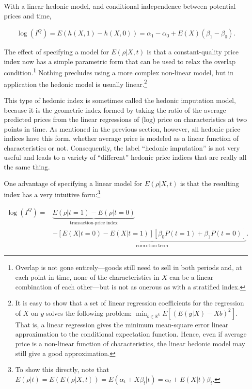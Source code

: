 \documentclass[]{article}
\begin{document}
With a linear hedonic model, and conditional independence between potential prices and time,

\begin{align*}
\log(I^{Q}) = E(h(X, 1) - h(X, 0)) = \alpha_{1} - \alpha_{0} + E(X)(\beta_{1} - \beta_{0}). 
\end{align*}

The effect of specifying a model for \(E(\rho | X, t)\) is that a constant-quality price index now has a simple parametric form that can be used to relax the overlap condition.\footnote{Overlap is not gone entirely---goods still need to sell in both periods and, at each point in time, none of the characteristics in \(X\) can be a linear combination of each other---but is not as onerous as with a stratified index.} Nothing precludes using a more complex non-linear model, but in application the hedonic model is usually linear.\footnote{It is easy to show that a set of linear regression coefficients for the regression of \(X\) on \(y\) solves the following problem: \(\min_{b \in \mathbb{R}^{k}} E[(E(y | X) - Xb)^{2}]\). That is, a linear regression gives the minimum mean-square error linear approximation to the conditional expectation function. Hence, even if average price is a non-linear function of characteristics, the linear hedonic model may still give a good approximation.}

This type of hedonic index is sometimes called the hedonic imputation model, because it is the geometric index formed by taking the ratio of the average predicted prices from the linear regressions of (log) price on characteristics at two points in time. As mentioned in the previous section, however, all hedonic price indices have this form, whether average price is modeled as a linear function of characteristics or not. Consequently, the label ``hedonic imputation'' is not very useful and leads to a variety of ``different'' hedonic price indices that are really all the same thing.

One advantage of specifying a linear model for \(E(\rho | X, t)\) is that the resulting index has a very intuitive form:\footnote{To show this directly, note that \(E(\rho | t) = E(E(\rho | X, t)) = E(\alpha_{t} + X\beta_{t} | t) = \alpha_{t} + E(X | t) \beta_{t}\).}

\begin{align*}
\log(I^{Q}) =& \underbrace{E(\rho | t = 1) - E(\rho | t = 0)}_{\text{transaction-price index}}\\
&+ \underbrace{[E(X | t = 0) - E(X | t = 1)][\beta_{0} P(t = 1) + \beta_{1} P(t = 0)]}_{\text{correction term}}.
\end{align*}
\end{document}
